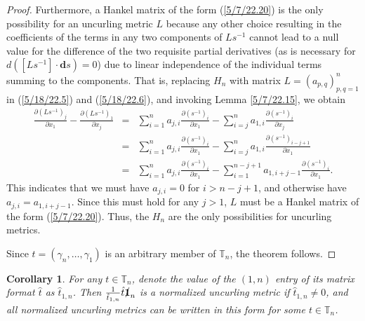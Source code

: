 \documentclass{amsart}
\newtheorem{corollary}[theorem]{Corollary}
\theoremstyle{definition}
\numberwithin{theorem}{section}
\numberwithin{equation}{section}
\begin{document}
\begin{proof}
\enlargethispage{1cm}
Furthermore, a Hankel matrix of the form (\ref{5/7/22.20}) is the only possibility for an uncurling metric $L$ because any other choice resulting in the coefficients of the terms in any two components of $Ls^{-1}$ cannot lead to a null value for the difference of the two requisite partial derivatives (as is necessary for $d\left([L s^{-1}]\cdot \mathbf{d}s\right) = 0$) due to linear independence of the individual terms summing to the components. That is, replacing  $H_n$ with matrix $L=(a_{p,q})_{p,q=1}^n$ in (\ref{5/18/22.5}) 
and (\ref{5/18/22.6}), and invoking Lemma \ref{5/7/22.15}, we obtain
\begin{eqnarray}\nonumber \frac{\partial \left(L s^{-1}\right)_j}{\partial x_1}  -  \frac{\partial \left(L s^{-1}\right)_1}{\partial x_j} &=&  \sum_{i=1}^n a_{j,i}\frac{\partial \left(s^{-1}\right)_i}{\partial x_1} - \sum_{i=j}^n a_{1,i}\frac{\partial \left(s^{-1}\right)_i}{\partial x_j} \\  &=& \sum_{i=1}^n a_{j,i}\frac{\partial \left(s^{-1}\right)_i}{\partial x_1} - \sum_{i=j}^n a_{1,i}\frac{\partial \left(s^{-1}\right)_{i-j+1}}{\partial x_1} \nonumber \\
&=& \sum_{i=1}^n a_{j,i}\frac{\partial \left(s^{-1}\right)_i}{\partial x_1} - \sum_{i=1}^{n-j+1} a_{1,i+j-1}\frac{\partial \left(s^{-1}\right)_i}{\partial x_1}.
\label{5/9/22.10}
\end{eqnarray}
This indicates that we must have $a_{j,i}=0$ for $i>n-j+1$, and otherwise have $a_{j,i} = a_{1,i+j-1}$.  Since this must hold for any $j>1$, $L$ must be a Hankel matrix of the form (\ref{5/7/22.20}).  Thus, the $H_n$ are the only possibilities for uncurling metrics. 

Since $t=(\gamma_n,\dots,\gamma_1)$ is an arbitrary member of $\mathbb{T}_n$, the theorem follows.
\end{proof}

\begin{corollary}\label{7/1/22.1} For any $t\in \mathbb{T}_n$, denote the value of the $(1,n)$ entry of its matrix format $\hat{t}$ as $\hat{t}_{1,n}$.  Then $\frac{1}{\hat{t}_{1,n}}\hat{t}\slashed{\bf 1}_n$ is a normalized uncurling metric if $\hat{t}_{1,n}\ne 0$, and all normalized uncurling metrics can be written in this form for some $t\in \mathbb{T}_n$. \end{corollary}
\end{document}
